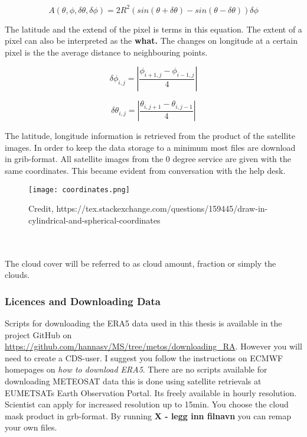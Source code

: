 \begin{equation} \label{eq:sphere_finish}
    A \left( \theta, \phi, \delta \theta, \delta \phi   \right)= 2R^2 \left( sin\left( \theta + \delta \theta  \right) - sin\left(  \theta - \delta \theta  \right) \right) \delta \phi
\end{equation} 

The latitude and the extend of the pixel is terms in this equation. The extent of a pixel can also be interpreted as the \textbf{what.} The changes on longitude at a certain pixel is the the average distance to neighbouring points.

\begin{equation} \label{eq:app_lon}
    \delta \phi_{i,j} = \left| \frac{\phi_{i+1,j} - \phi_{i-1, j}}{4} \right|
\end{equation}

\begin{equation} \label{eq:app_lat}
    \delta \theta_{i,j} = \left| \frac{\theta_{i,j+1} - \theta_{i, j-1}}{4} \right|
\end{equation}

The latitude, longitude information is retrieved from the product of the satellite images. In order to keep the data storage to a minimum most files are download in grib-format. All satellite images from the 0 degree service are given with the same coordinates. This became evident from conversation with the help desk. 
\begin{figure}[h]
    \centering
    \texttt{[image: coordinates.png]}
    \caption{Credit, https://tex.stackexchange.com/questions/159445/draw-in-cylindrical-and-spherical-coordinates}
    \label{fig:coords}
\end{figure}

\\ \\
The cloud cover will be referred to as cloud amount, fraction or simply the clouds.
\subsubsection{Licences and Downloading Data}
Scripts for downloading the ERA5 data used in this thesis is available in the project GitHub on \href{https://github.com/hannasv/MS/tree/metos/downloading_RA}{https://github.com/hannasv/MS/tree/metos/downloading_RA}. However you will need to create a CDS-user. I suggest you follow the instructions on ECMWF homepages on \textit{how to download ERA5}. 
There are no scripts available for downloading METEOSAT data this is done using satellite retrievals at EUMETSATs Earth Observation Portal. Its freely available in hourly resolution. Scientist can apply for increased resolution up to 15min. You choose the cloud mask product in grb-format. By running \textbf{X - legg inn filnavn} you can remap your own files.
